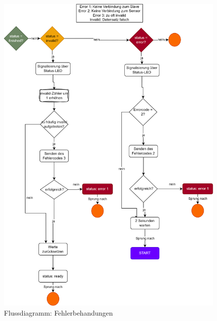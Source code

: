 \documentclass[11pt,a4paper,titlepage]{article}
\begin{document}
\begin{figure}[H]
    \centering
    \includegraphics[height=0.9\textheight]{./Bilder-Tobit/flussdiagramm_invalid_error.png}
    \caption{Flussdiagramm: Fehlerbehandungen}
    \label{fig:flussdiagramm_invalid_error}
\end{figure}
\end{document}
